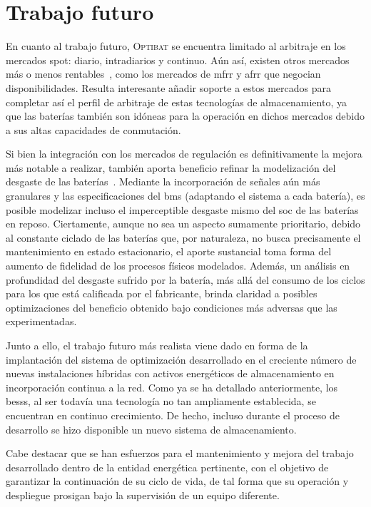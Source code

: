 \section{Trabajo futuro}%
\label{makereference8.2}

En cuanto al trabajo futuro, \textsc{Optibat} se encuentra limitado al arbitraje en los mercados spot: diario, intradiarios y continuo. Aún así, existen otros mercados más o menos rentables~\cite{cnmc2024balance}, como los mercados de \gls{mfrr} y \gls{afrr} que negocian disponibilidades. Resulta interesante añadir soporte a estos mercados para completar así el perfil de arbitraje de estas tecnologías de almacenamiento, ya que las baterías también son idóneas para la operación en dichos mercados debido a sus altas capacidades de conmutación.

Si bien la integración con los mercados de regulación es definitivamente la mejora más notable a realizar, también aporta beneficio refinar la modelización del desgaste de las baterías~\cite{shamarova2022review}. Mediante la incorporación de señales aún más granulares y las especificaciones del \gls{bms} (adaptando el sistema a cada batería), es posible modelizar incluso el imperceptible desgaste mismo del \gls{soc} de las baterías en reposo. Ciertamente, aunque no sea un aspecto sumamente prioritario, debido al constante ciclado de las baterías que, por naturaleza, no busca precisamente el mantenimiento en estado estacionario, el aporte sustancial toma forma del aumento de fidelidad de los procesos físicos modelados. Además, un análisis en profundidad del desgaste sufrido por la batería, más allá del consumo de los ciclos para los que está calificada por el fabricante, brinda claridad a posibles optimizaciones del beneficio obtenido bajo condiciones más adversas que las experimentadas.

Junto a ello, el trabajo futuro más realista viene dado en forma de la implantación del sistema de optimización desarrollado en el creciente número de nuevas instalaciones híbridas con activos energéticos de almacenamiento en incorporación continua a la red. Como ya se ha detallado anteriormente, los \glspl{bess}, al ser todavía una tecnología no tan ampliamente establecida, se encuentran en continuo crecimiento. De hecho, incluso durante el proceso de desarrollo se hizo disponible un nuevo sistema de almacenamiento.

Cabe destacar que se han esfuerzos para el mantenimiento y mejora del trabajo desarrollado dentro de la entidad energética pertinente, con el objetivo de garantizar la continuación de su ciclo de vida, de tal forma que su operación y despliegue prosigan bajo la supervisión de un equipo diferente.
